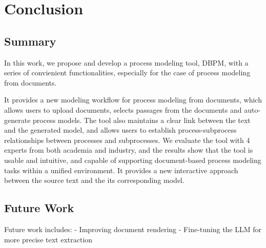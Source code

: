 \chapter{Conclusion}
\label{sec:conclusion}
\section{Summary}
In this work, we propose and develop a process modeling tool, DBPM, with a series of convienient functionalities, especially for the case of process modeling from documents.

It provides a new modeling workflow for process modeling from documents, which allows users to upload documents, selects passages from the documents and auto-generate process models. The tool also maintains a clear link between the text and the generated model, and allows users to establish process-subprocess relationships between processes and subprocesses. We evaluate the tool with 4 experts from both academia and industry, and the results show that the tool is usable and intuitive, and capable of supporting document-based process modeling tasks within a unified environment.
It provides a new interactive approach between the source text and the its corresponding model.

\section{Future Work}
Future work includes:
- Improving document rendering
- Fine-tuning the LLM for more precise text extraction